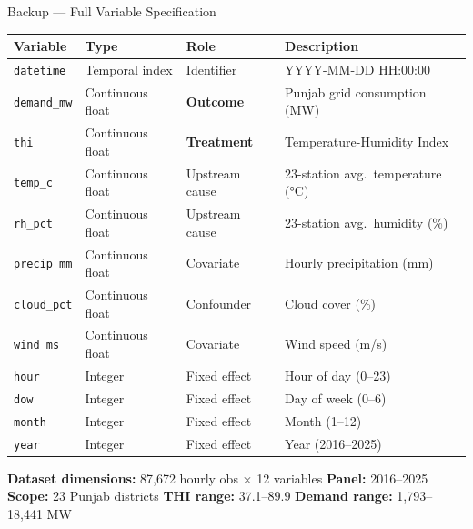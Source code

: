 \documentclass[aspectratio=169, 10pt]{beamer}
\begin{document}
\begin{frame}{Backup — Full Variable Specification}

\centering
\small
\begin{tabular}{@{}llll@{}}
\toprule
Variable & Type & Role & Description \\
\midrule
\texttt{datetime}   & Temporal index   & Identifier         & YYYY-MM-DD HH:00:00 \\
\texttt{demand\_mw} & Continuous float & \textbf{Outcome}   & Punjab grid consumption (MW) \\
\texttt{thi}        & Continuous float & \textbf{Treatment} & Temperature-Humidity Index \\
\texttt{temp\_c}    & Continuous float & Upstream cause     & 23-station avg.\ temperature (°C) \\
\texttt{rh\_pct}    & Continuous float & Upstream cause     & 23-station avg.\ humidity (\%) \\
\texttt{precip\_mm} & Continuous float & Covariate          & Hourly precipitation (mm) \\
\texttt{cloud\_pct} & Continuous float & Confounder         & Cloud cover (\%) \\
\texttt{wind\_ms}   & Continuous float & Covariate          & Wind speed (m/s) \\
\texttt{hour}       & Integer          & Fixed effect       & Hour of day (0–23) \\
\texttt{dow}        & Integer          & Fixed effect       & Day of week (0–6) \\
\texttt{month}      & Integer          & Fixed effect       & Month (1–12) \\
\texttt{year}       & Integer          & Fixed effect       & Year (2016–2025) \\
\bottomrule
\end{tabular}

\vspace{0.7em}
\textbf{Dataset dimensions:} 87,672 hourly obs $\times$ 12 variables \quad
\textbf{Panel:} 2016–2025 \quad
\textbf{Scope:} 23 Punjab districts \quad
\textbf{THI range:} 37.1–89.9 \quad
\textbf{Demand range:} 1,793–18,441 MW

\end{frame}
\end{document}
